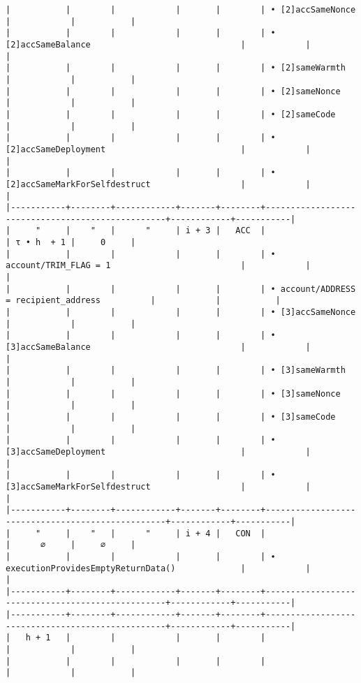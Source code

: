 \documentclass[varwidth=\maxdimen,margin=0.5cm,multi={verbatim}]{standalone}
\begin{document}
\begin{verbatim}
|           |        |            |       |        | • [2]accSameNonce                                |            |           |
|           |        |            |       |        | • [2]accSameBalance                              |            |           |
|           |        |            |       |        | • [2]sameWarmth                                  |            |           |
|           |        |            |       |        | • [2]sameNonce                                   |            |           |
|           |        |            |       |        | • [2]sameCode                                    |            |           |
|           |        |            |       |        | • [2]accSameDeployment                           |            |           |
|           |        |            |       |        | • [2]accSameMarkForSelfdestruct                  |            |           |
|-----------+--------+------------+-------+--------+--------------------------------------------------+------------+-----------|
|     "     |    "   |      "     | i + 3 |   ACC  |                                                  | τ • h  + 1 |     0     |
|           |        |            |       |        | • account/TRIM_FLAG = 1                          |            |           |
|           |        |            |       |        | • account/ADDRESS   = recipient_address          |            |           |
|           |        |            |       |        | • [3]accSameNonce                                |            |           |
|           |        |            |       |        | • [3]accSameBalance                              |            |           |
|           |        |            |       |        | • [3]sameWarmth                                  |            |           |
|           |        |            |       |        | • [3]sameNonce                                   |            |           |
|           |        |            |       |        | • [3]sameCode                                    |            |           |
|           |        |            |       |        | • [3]accSameDeployment                           |            |           |
|           |        |            |       |        | • [3]accSameMarkForSelfdestruct                  |            |           |
|-----------+--------+------------+-------+--------+--------------------------------------------------+------------+-----------|
|     "     |    "   |      "     | i + 4 |   CON  |                                                  |      ∅     |     ∅     |
|           |        |            |       |        | ∙ executionProvidesEmptyReturnData()             |            |           |
|-----------+--------+------------+-------+--------+--------------------------------------------------+------------+-----------|
|-----------+--------+------------+-------+--------+--------------------------------------------------+------------+-----------|
|   h + 1   |        |            |       |        |                                                  |            |           |
|           |        |            |       |        |                                                  |            |           |
\end{verbatim}
\end{document}

